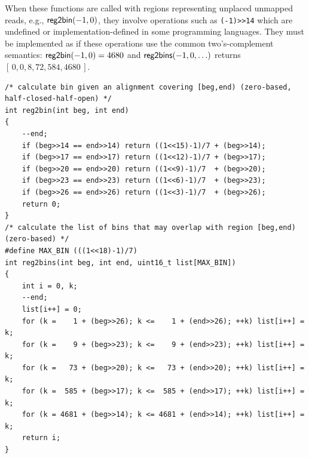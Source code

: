 \documentclass[10pt]{article}
\begin{document}
When these functions are called with regions representing unplaced
unmapped reads, e.g., $\mbox{\sf reg2bin}(-1, 0)$, they involve operations
such as \verb|(-1)>>14| which are undefined or implementation-defined in
some programming languages.
They must be implemented as if these operations use the common
two's-complement semantics: $\mbox{\sf reg2bin}(-1, 0) = 4680$ and
$\mbox{\sf reg2bins}(-1, 0, \ldots)$ returns $[\,0, 0, 8, 72, 584, 4680\,]$.

{\small
\begin{verbatim}
/* calculate bin given an alignment covering [beg,end) (zero-based, half-closed-half-open) */
int reg2bin(int beg, int end)
{
    --end;
    if (beg>>14 == end>>14) return ((1<<15)-1)/7 + (beg>>14);
    if (beg>>17 == end>>17) return ((1<<12)-1)/7 + (beg>>17);
    if (beg>>20 == end>>20) return ((1<<9)-1)/7  + (beg>>20);
    if (beg>>23 == end>>23) return ((1<<6)-1)/7  + (beg>>23);
    if (beg>>26 == end>>26) return ((1<<3)-1)/7  + (beg>>26);
    return 0;
}
/* calculate the list of bins that may overlap with region [beg,end) (zero-based) */
#define MAX_BIN (((1<<18)-1)/7)
int reg2bins(int beg, int end, uint16_t list[MAX_BIN])
{
    int i = 0, k;
    --end;
    list[i++] = 0;
    for (k =    1 + (beg>>26); k <=    1 + (end>>26); ++k) list[i++] = k;
    for (k =    9 + (beg>>23); k <=    9 + (end>>23); ++k) list[i++] = k;
    for (k =   73 + (beg>>20); k <=   73 + (end>>20); ++k) list[i++] = k;
    for (k =  585 + (beg>>17); k <=  585 + (end>>17); ++k) list[i++] = k;
    for (k = 4681 + (beg>>14); k <= 4681 + (end>>14); ++k) list[i++] = k;
    return i;
}
\end{verbatim}
}

\pagebreak
\end{document}
